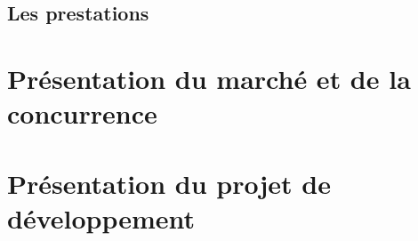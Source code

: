 \documentclass[a4paper,12pt]{report}
\begin{document}

\subsection{Les prestations}

\section{Présentation du marché et de la concurrence}
\section{Présentation du projet de développement}
\end{document}
